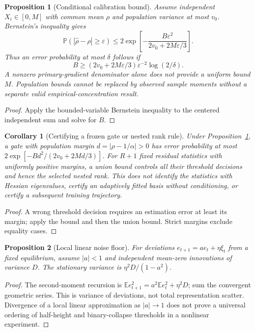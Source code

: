 \documentclass{article}
\newtheorem{proposition}{Proposition}
\newtheorem{corollary}{Corollary}
\begin{document}
\begin{proposition}[Conditional calibration bound]\label{prop:calibration}
Assume independent $X_i\in[0,M]$ with common mean $\rho$ and population variance at most $v_0$. Bernstein's inequality gives
\begin{equation}
\mathbb P(|\hat\rho-\rho|\ge\varepsilon)\le2\exp\left[-\frac{B\varepsilon^2}{2v_0+2M\varepsilon/3}\right].
\label{eq:calibration}
\end{equation}
Thus an error probability at most $\delta$ follows if
\begin{equation}
B\ge(2v_0+2M\varepsilon/3)\varepsilon^{-2}\log(2/\delta).
\label{eq:samplesize}
\end{equation}
A nonzero primary-gradient denominator alone does not provide a uniform bound $M$. Population bounds cannot be replaced by observed sample moments without a separate valid empirical-concentration result.
\end{proposition}
\begin{proof}
Apply the bounded-variable Bernstein inequality to the centered independent sum and solve for $B$.
\end{proof}

\begin{corollary}[Certifying a frozen gate or nested rank rule]\label{cor:certificate}
Under Proposition~\ref{prop:calibration}, a gate with population margin $d=|\rho-1/\alpha|>0$ has error probability at most $2\exp[-Bd^2/(2v_0+2Md/3)]$. For $R+1$ fixed residual statistics with uniformly positive margins, a union bound controls all their threshold decisions and hence the selected nested rank. This does not identify the statistics with Hessian eigenvalues, certify an adaptively fitted basis without conditioning, or certify a subsequent training trajectory.
\end{corollary}
\begin{proof}
A wrong threshold decision requires an estimation error at least its margin; apply the bound and then the union bound. Strict margins exclude equality cases.
\end{proof}

\begin{proposition}[Local linear noise floor]\label{prop:lyapunov}
For deviations $e_{t+1}=a e_t+\eta\xi_t$ from a fixed equilibrium, assume $|a|<1$ and independent mean-zero innovations of variance $D$. The stationary variance is $\eta^2D/(1-a^2)$.
\end{proposition}
\begin{proof}
The second-moment recursion is $\mathbb E e_{t+1}^2=a^2\mathbb E e_t^2+\eta^2D$; sum the convergent geometric series. This is variance of deviations, not total representation scatter. Divergence of a local linear approximation as $|a|\to1$ does not prove a universal ordering of half-height and binary-collapse thresholds in a nonlinear experiment.
\end{proof}
\end{document}
